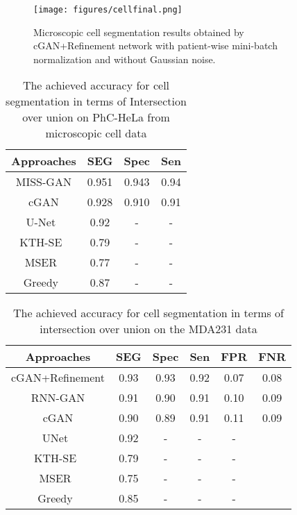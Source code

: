 \documentclass[10pt,twocolumn,letterpaper]{article}
\begin{document}
\begin{figure}
\texttt{[image: figures/cellfinal.png]}
\centering
\caption{Microscopic cell segmentation results obtained by cGAN+Refinement network with patient-wise mini-batch normalization and without Gaussian noise.}
\label{figcall}
\end{figure}\begin{table}[!htbp]
\centering
\caption{The achieved accuracy for cell segmentation in terms of Intersection over union on PhC-HeLa from microscopic cell data}
\begin{tabular}{*4c}
\toprule
Approaches    &  SEG & Spec  & Sen \\
\midrule
MISS-GAN   & 0.951 & 0.943  & 0.94   \\
cGAN   &  0.928 & 0.910  & 0.91   \\
U-Net~\cite{ronneberger2015u}   &  0.92 & -  & -    \\
KTH-SE~\cite{magnusson2012batch}  &  0.79 & -  & - \\
MSER~\cite{arteta2012learning} &  0.77 & -  & - \\
Greedy~\cite{Akram}&  0.87 & -  & - \\
\bottomrule
\end{tabular}
\label{tabel_cell1}
\end{table}\begin{table}[!htbp]
\centering
\caption{The achieved accuracy for cell segmentation in terms of intersection over union on the MDA231 data}
\begin{tabular}{*6c}
\toprule
Approaches & SEG & Spec  & Sen & FPR & FNR  \\
\midrule
cGAN+Refinement  & 0.93 & 0.93 & 0.92 &  0.07   & 0.08   \\
RNN-GAN   &  0.91 & 0.90  & 0.91  & 0.10   & 0.09  \\
cGAN   &  0.90 & 0.89  & 0.91  & 0.11   & 0.09  \\
UNet~\cite{ronneberger2015u}   &  0.92 & -  & -  & -    \\
KTH-SE~\cite{magnusson2012batch}   &  0.79 & -  & - & -   \\
MSER~\cite{arteta2012learning} &  0.75 & -  & - & -  \\
Greedy~\cite{Akram}&  0.85 & -  & - & -  \\
\bottomrule
\end{tabular}
\label{tabel_cell2}
\end{table}\begin{figure*}[!t]
  \centering

\end{figure*}
\end{document}
